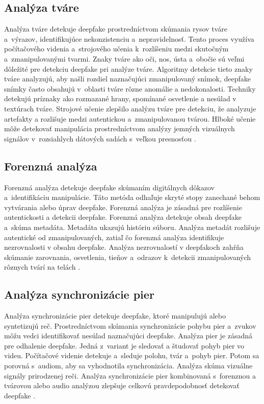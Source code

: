 \subsection{Analýza tváre}
Analýza tváre detekuje deepfake prostredníctvom skúmania rysov tváre a~výrazov, identifikujúce nekonzistenciu a~nepravidelnosť. Tento proces využíva počítačového videnia a~strojového učenia k~rozlíšeniu medzi skutočným a~zmanipulovanými tvarmi. Znaky tváre ako oči, nos, ústa a~obočie sú veľmi dôležité pre detekciu deepfake pri analýze tváre. Algoritmy detekcie tieto znaky tváre analyzujú, aby našli rozdiel naznačujúci zmanipulovaný snímok, deepfake snímky často obsahujú v~oblasti tváre rôzne anomálie a nedokonalosti. Techniky detekujú príznaky ako rozmazané hrany, spomínané osvetlenie a nesúlad v textúrach tváre. Strojové učenie zlepšilo analýzu tváre pre detekciu, že analyzuje artefakty a rozlišuje medzi autentickou a~zmanipulovanou tvárou. Hlboké učenie môže detekovať manipulácia prostredníctvom analýzy jemných vizuálnych signálov v~rozsiahlych dátových sadách s~veľkou presnosťou \cite{Deepdetect}.

\subsection{Forenzná analýza}
Forenzná analýza detekuje deepfake skúmaním digitálnych dôkazov a~identifikáciu manipulácie. Táto metóda odhaľuje skryté stopy zanechané behom vytvárania alebo úprav deepfake. Forenzná analýza je zásadná pre rozlíšenie autentickosti a detekcii deepfake. Forenzná analýza detekuje obsah deepfake a~skúma metadáta. Metadáta ukazujú históriu súboru. Analýza metadát rozlišuje autentické od zmanipulovaných, zatiaľ čo forenzná analýza identifikuje nezrovnalosti v obsahu deepfake. Analýza nezrovnalostí v deepfakoch zahŕňa skúmanie zarovnania, osvetlenia, tieňov a~odrazov k~detekcii zmanipulovaných rôznych tvárí na telách \cite{Deepdetect}.

\subsection{Analýza synchronizácie pier}
Analýza synchronizácie pier detekuje deepfake, ktoré manipulujú alebo syntetizujú reč. Prostredníctvom skúmania synchronizácie pohybu pier a~zvukov môžu vedci identifikovať nesúlad naznačujúci deepfake. Analýza pier je zásadná pre odhalenie deepfake. Jedná z~variant je sledovať a študovať pohyb pier vo videu. Počítačové videnie detekuje a~sleduje polohu, tvár a~pohyb pier. Potom sa porovná s~audiom, aby sa vyhodnotila synchronizácia. Analýza skúma vizuálne signály prirodzenej reči. Analýza synchronizácie pier kombinovaná s~forenznou a tvárovou alebo audio analýzou zlepšuje celkovú pravdepodobnosť detekovať deepfake \cite{Deepdetect}.

